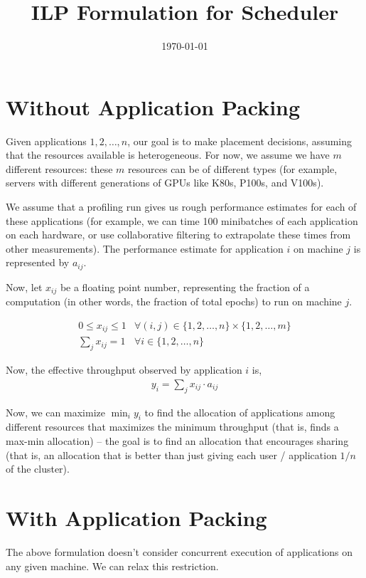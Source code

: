 \documentclass{article}
\title{ILP Formulation for Scheduler}
\date{\today}
\begin{document}
\maketitle

\section{Without Application Packing}
Given applications $1, 2, \ldots, n$, our goal is to make placement
decisions, assuming that the resources available is heterogeneous. For now, we
assume we have $m$ different resources: these $m$ resources can be of different types (for
example, servers with different generations of GPUs like K80s, P100s, and V100s).

We assume that a profiling run gives us rough performance estimates for each
of these applications (for example, we can time 100 minibatches of each application
on each hardware, or use collaborative filtering to extrapolate these
times from other measurements). The performance estimate for application $i$
on machine $j$ is represented by $a_{ij}$.

Now, let $x_{ij}$ be a floating point number, representing the fraction of
a computation (in other words, the fraction of total epochs) to run on
machine $j$.

\begin{eqnarray}
0 \leq x_{ij} \leq 1 & \forall (i,j) \in \{1, 2, \ldots, n\} \times \{1, 2, \ldots, m\} \nonumber  \\
\sum_j x_{ij} = 1 & \forall i \in \{1, 2, \ldots, n\} \nonumber
\end{eqnarray}

Now, the effective throughput observed by application $i$ is,
\begin{eqnarray}
y_i = \sum_j x_{ij} \cdot a_{ij} \nonumber
\end{eqnarray}

Now, we can maximize $\min_i y_i$ to find the allocation of applications
among different resources that maximizes the minimum throughput (that is,
finds a max-min allocation) -- the goal is to find an allocation that encourages
sharing (that is, an allocation that is better than just giving each user / application
$1/n$ of the cluster).

\section{With Application Packing}
The above formulation doesn't consider concurrent execution of applications
on any given machine. We can relax this restriction.
\end{document}
